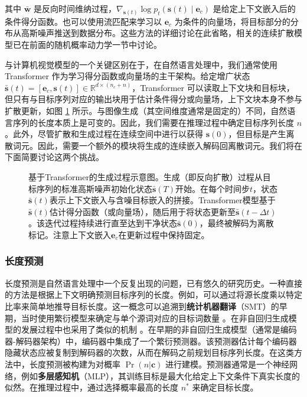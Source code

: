 \noindent 其中 $\bar{\mathbf{w}}$ 是反向时间维纳过程，$\nabla_{\mathbf{s}(t)}\log p_t(\mathbf{s}(t)\mid\mathbf{e}_c)$ 是给定上下文嵌入后的条件得分函数。也可以使用流匹配来学习以 $\mathbf{e}_c$ 为条件的向量场，将目标部分的分布从高斯噪声推送到数据分布。这些方法的详细讨论在此省略，相关的连续扩散模型已在前面的随机概率动力学一节中讨论。

与计算机视觉模型的一个关键区别在于，在自然语言处理中，我们通常使用 Transformer 作为学习得分函数或向量场的主干架构。给定增广状态 $\bar{\mathbf{s}}(t) = [\mathbf{e}_c, \mathbf{s}(t)] \in \mathbb{R}^{d \times (n_c + n)}$，Transformer 可以读取上下文块和目标块，但只有与目标序列对应的输出块用于估计条件得分或向量场，上下文块本身不参与扩散更新，如图 \ref{fig:transformer-based-generation-process} 所示。与图像生成（其空间维度通常是固定的）不同，自然语言序列的长度本质上是可变的。因此，我们需要在推理过程中确定目标序列长度 $n$。此外，尽管扩散和生成过程在连续空间中进行以获得 $\mathbf{s}(0)$，但目标是产生离散词元。因此，需要一个额外的模块将生成的连续嵌入解码回离散词元。我们将在下面简要讨论这两个挑战。

\begin{figure}[!t]
\centering
{}
\caption{基于Transformer的生成过程示意图。生成（即反向扩散）过程从目标序列的标准高斯噪声初始化状态$\bar{\mathbf{s}}(T)$开始。在每个时间步$t$，状态$\bar{\mathbf{s}}(t)$表示上下文嵌入与含噪目标嵌入的拼接。Transformer模型基于$\bar{\mathbf{s}}(t)$估计得分函数（或向量场），随后用于将状态更新至$\bar{\mathbf{s}}(t-\Delta t)$。该迭代过程持续进行直至达到干净状态$\bar{\mathbf{s}}(0)$，最终被解码为离散标记。注意上下文嵌入$\mathbf{e}_c$在更新过程中保持固定。}
\label{fig:transformer-based-generation-process}
\end{figure}
\subsubsection{长度预测}

长度预测是自然语言处理中一个反复出现的问题，已有悠久的研究历史。一种直接的方法是根据上下文明确预测目标序列的长度。例如，可以通过将源长度乘以特定比率来简单地推导目标长度。这一概念可以追溯到\textbf{统计机器翻译}（SMT）的早期，当时使用繁衍模型来确定与单个源词对应的目标词数量 \citep{brown-etal:1993mathematics}。在非自回归生成模型的发展过程中也采用了类似的机制 \citep{xiao-etal:2023survey}。在早期的非自回归生成模型（通常是编码器-解码器架构）中，编码器中集成了一个繁衍预测器。该预测器估计每个编码器隐藏状态应被复制到解码器的次数，从而在解码之前规划目标序列长度。在这类方法中，长度预测被构建为对概率 $\Pr(n|\mathbf{c})$ 进行建模。预测器通常是一个神经网络，例如\textbf{多层感知机}（MLP），其训练目标是最大化给定上下文条件下真实长度的似然。在推理过程中，通过选择概率最高的长度 $n^*$ 来确定目标长度。

